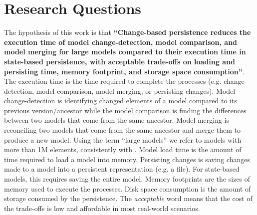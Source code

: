 \documentclass[12pt, a4paper]{report} \usepackage[titletoc]{appendix}
\begin{document}
\section{Research Questions}
\label{sec:research_questions}
The hypothesis of this work is that \textbf{``Change-based persistence reduces the execution time of model change-detection, model comparison, and model merging for large models compared to their execution time in state-based persistence, with acceptable trade-offs on loading and persisting time, memory footprint, and storage space consumption''}. The execution time is the time required to complete the processes (e.g. change-detection, model comparison, model merging, or persisting changes). Model change-detection is identifying changed elements of a model compared to its previous version/ancestor while the model comparison is finding the differences between two models that come from the same ancestor. Model merging is reconciling two models that come from the same ancestor and merge them to produce a new model. Using the term ``large models'' we refer to models with more than 1M elements, consistently with \cite{daniel2016neoemf,DBLP:conf/models/Espinazo-PaganCM11}. Model load time is the amount of time required to load a model into memory. Persisting changes is saving changes made to a model into a persistent representation (e.g. a file). For state-based models, this requires saving the entire model. Memory footprints are the sizes of memory used to execute the processes. Disk space consumption is the amount of storage consumed by the persistence. The \emph{acceptable} word means that the cost of the trade-offs is low and affordable in most real-world scenarios.
\end{document}

